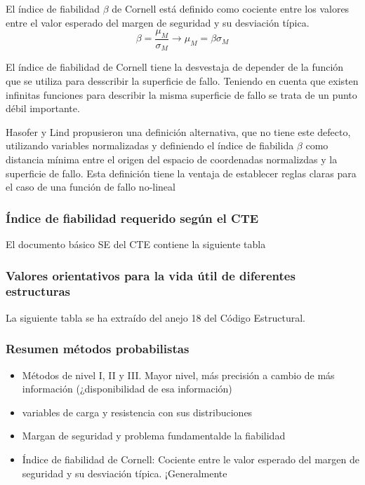El índice de fiabilidad $\beta$ de Cornell está definido como cociente entre los valores entre el valor esperado del margen de seguridad y su desviación típica.
\[\beta = \frac{\mu_M}{\sigma_M} \rightarrow \mu_M = \beta \sigma_M\]


El índice de fiabilidad de Cornell tiene la desvestaja de depender de la función que se utiliza para desscribir la superficie de fallo. Teniendo en cuenta que existen infinitas funciones para describir la misma superficie de fallo se trata de un punto débil importante.

Hasofer y Lind propusieron una definición alternativa, que no tiene este defecto, utilizando variables normalizadas
y definiendo el índice de fiabilida $\beta$ como distancia mínima entre el origen del espacio de coordenadas normalizdas y la superficie de fallo. Esta definición tiene la ventaja de establecer reglas claras para el caso de una función de fallo no-lineal


\subsubsection{Índice de fiabilidad requerido según el CTE}
El documento básico SE del CTE contiene la siguiente tabla 

\subsubsection{Valores orientativos para la vida útil de diferentes estructuras}
La siguiente tabla se ha extraído del anejo 18 del Código Estructural.

\subsubsection{Resumen métodos probabilistas}
\begin{itemize}
    \item Métodos de nivel I, II y III.  Mayor nivel, más precisión a cambio de más información (¿disponibilidad de esa información)
    \item variables de carga y resistencia con sus distribuciones
    \item Margan de seguridad y problema fundamentalde la fiabilidad
    \item Índice de fiabilidad de Cornell: Cociente entre le valor esperado del margen de seguridad y su desviación típica. ¡Generalmente 
\end{itemize}

